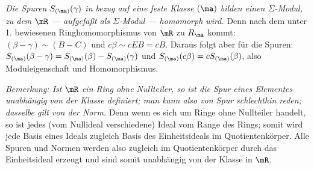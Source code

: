 \emph{Die Spuren $S_{(\ma)}(\gamma)$ in bezug auf eine feste Klasse $(\ma)$ bilden einen $\Sigma$-Modul, zu dem $\mR$ --- aufgefaßt als $\Sigma$-Modul --- homomorph wird.} Denn nach dem unter 1. bewiesenen Ringhomomorphismus von $\mR$ zu $R_\ma$ kommt: $(\beta-\gamma)\sim(B-C)$ und $c\beta\sim cEB=cB$. Daraus folgt aber für die Spuren: $S_{(\ma)}(\beta-\gamma)=S_{(\ma)}(\beta)-S_{(\ma)}(\gamma)$ und $S_{(\ma)}(c\beta)=cS_{(\ma)}(\beta)$, also Moduleigenschaft und Homomorphismus.

\emph{Bemerkung: Ist $\mR$ ein Ring ohne Nullteiler, so ist die Spur eines Elementes unabhängig von der Klasse definiert; man kann also von Spur schlechthin reden; dasselbe gilt von der Norm.} Denn wenn es sich um Ringe ohne Nullteiler handelt, so ist jedes (vom Nullideal verschiedene) Ideal vom Range des Rings; somit wird jede Basis eines Ideals zugleich Basis des Einheitsideals im Quotientenkörper. Alle Spuren und Normen werden also zugleich im Quotientenkörper durch das Einheitsideal erzeugt und sind somit unabhängig von der Klasse in $\mR$.